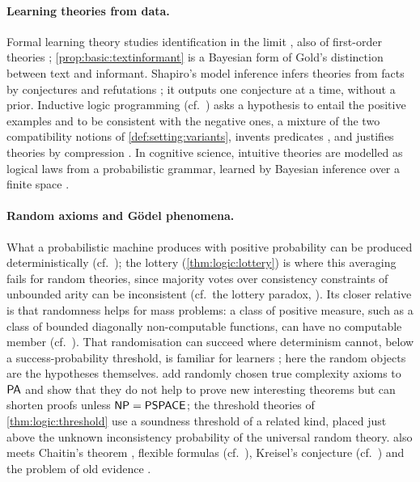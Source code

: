 \paragraph{Learning theories from data.}
Formal learning theory studies identification in the limit \citep{gold1967language,putnam1965trial}, also of first-order theories \citep{osherson1991universal,kelly1996logic,martin1998elements}; \cref{prop:basic:textinformant} is a Bayesian form of Gold's distinction between text and informant. Shapiro's model inference infers theories from facts by conjectures and refutations \citep{shapiro1981algorithm,shapiro1991inductive}; it outputs one conjecture at a time, without a prior. Inductive logic programming (cf.\ \citealp{muggleton1994inductive,cropper2022inductive}) asks a hypothesis to entail the positive examples and to be consistent with the negative ones, a mixture of the two compatibility notions of \cref{def:setting:variants}, invents predicates \citep{muggleton1988machine}, and justifies theories by compression \citep{muggleton1995inverse,conklin1994complexity}. In cognitive science, intuitive theories are modelled as logical laws from a probabilistic grammar, learned by Bayesian inference over a finite space \citep{kemp2008theory,kemp2010probabilistic,ullman2012theory}.

\paragraph{Random axioms and Gödel phenomena.}
What a probabilistic machine produces with positive probability can be produced deterministically (cf.\ \citealp{deleeuw1956computability}); the lottery (\cref{thm:logic:lottery}) is where this averaging fails for random theories, since majority votes over consistency constraints of unbounded arity can be inconsistent (cf.\ the lottery paradox, \citealp{kyburg1961probability}). Its closer relative is that randomness helps for mass problems: a class of positive measure, such as a class of bounded diagonally non-computable functions, can have no computable member (cf.\ \citealp{kucera1985measure,bienvenu2016deep}). That randomisation can succeed where determinism cannot, below a success-probability threshold, is familiar for learners \citep{pitt1989probabilistic,ambainis1999probabilistic}; here the random objects are the hypotheses themselves. \citet{bienvenu2014axiomatic} add randomly chosen true complexity axioms to $\mathsf{PA}$ and show that they do not help to prove new interesting theorems but can shorten proofs unless $\mathsf{NP}=\mathsf{PSPACE}$; the threshold theories of \cref{thm:logic:threshold} use a soundness threshold of a related kind, placed just above the unknown inconsistency probability of the universal random theory.  also meets Chaitin's theorem \citep{chaitin1974information,raatikainen1998interpreting}, flexible formulas (cf.\ \citealp{kripke1962flexible,woodin2011potential}), Kreisel's conjecture (cf.\ \citealp{hrubes2009kreisel}) and the problem of old evidence \citep{garber1983old}.


